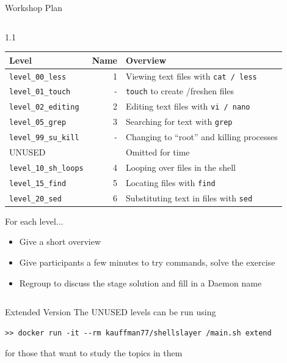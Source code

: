 \documentclass[mathserif]{beamer}
\begin{document}
\begin{frame}[label={sec:org314c934},fragile]{Workshop Plan}
 \vspace{-.4in}
\begin{columns}
\begin{column}{1.1\columnwidth}
\begin{block}{}
\normalsize
\begin{center}
\begin{tabular}{lrl}
\hline
Level & Name & Overview\\
\hline
\texttt{level\_00\_less} & 1 & Viewing text files with \texttt{cat / less}\\
\texttt{level\_01\_touch} & - & \texttt{touch} to create /freshen files\\
\texttt{level\_02\_editing} & 2 & Editing text files with \texttt{vi / nano}\\
\texttt{level\_05\_grep} & 3 & Searching for text with \texttt{grep}\\
\texttt{level\_99\_su\_kill} & - & Changing to ``root'' and killing processes\\
\hline
UNUSED &  & Omitted for time\\
\texttt{level\_10\_sh\_loops} & 4 & Looping over files in the shell\\
\texttt{level\_15\_find} & 5 & Locating files with \texttt{find}\\
\texttt{level\_20\_sed} & 6 & Substituting text in files with \texttt{sed}\\
\hline
\end{tabular}
\end{center}

\normalsize

For each level...
\begin{itemize}
\item Give a short overview
\item Give participants a few minutes to try commands, solve the exercise
\item Regroup to discuss the stage solution and fill in a Daemon name
\end{itemize}
\end{block}
\end{column}
\end{columns}
\end{frame}
\begin{frame}[label={sec:orgd908130},fragile]{Extended Version}
 The UNUSED levels can be run using
\fontsize{8}{9}
\begin{verbatim}
>> docker run -it --rm kauffman77/shellslayer /main.sh extend
\end{verbatim}
\normalsize
for those that want to study the topics in them
\end{frame}
\end{document}
